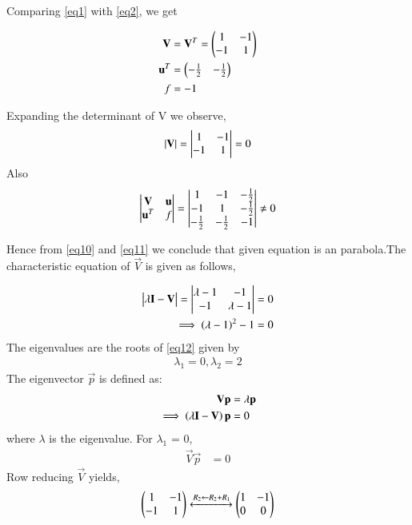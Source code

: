 \documentclass[journal,12pt,twocolumn]{IEEEtran}
\begin{document}
Comparing \eqref{eq1} with \eqref{eq2}, we get

\begin{align}
\mathbf{V} &= \mathbf{V}^T = \begin{pmatrix} 1 &  -1 \\ -1 & 1 \end{pmatrix}
\\
\mathbf{u}^T &= \begin{pmatrix}-\frac{1}{2} & - \frac{1}{2}\end{pmatrix}
\\
f &= -1
\end{align}


Expanding the determinant of V we observe,
\begin{align}
\left\vert\mathbf{V}\right\vert = \begin{vmatrix}1 & -1 \\ -1 & 1\end{vmatrix} = 0 \label{eq10}
\end{align}
Also
\begin{align}
\begin{vmatrix}\mathbf{V} & \mathbf{u} \\ \mathbf{u}^T & f\end{vmatrix} = 
\begin{vmatrix}
1 & -1 & -\frac{1}{2} \\ 
-1 & 1 & -\frac{1}{2} \\ 	
-\frac{1}{2} & -\frac{1}{2} & -1\end{vmatrix}
\neq 0
\label{eq11}
\end{align}

Hence from \eqref{eq10} and \eqref{eq11} we conclude
that given equation is an parabola.The characteristic equation of $\vec{V}$ is given as
follows,


\begin{align}
\begin{vmatrix}\lambda \mathbf{I}-\mathbf{V}\end{vmatrix} = \begin{vmatrix}\lambda -1 & -1 \\ -1 & \lambda - 1\end{vmatrix} &= 0
\\
\implies \left(\lambda - 1 \right)^2 -1 &= 0
\label{eq12}
\end{align}
The eigenvalues are the roots of \eqref{eq12} given by
\begin{align}
\lambda_1 = 0, \lambda_2 = 2
\label{eq13}
\end{align}
The eigenvector $\vec{p}$ is defined as:
\begin{align}
\mathbf{V} \mathbf{p}&= \lambda \mathbf{p}
\\
\implies \left(\lambda\mathbf{I}-\mathbf{V}\right)\mathbf{p} &=0
\end{align}
where $\lambda$ is the eigenvalue.  For $\lambda_1$ = 0,
\begin{align}
\vec{V} \vec{p}&=0
\end{align}
Row reducing $\vec{V}$ yields,
\begin{align}
 \begin{pmatrix} 1 & -1 \\ -1 & 1\end{pmatrix} 
\xleftrightarrow{R_2\leftarrow R_2+R_1} 
\begin{pmatrix}
	1 &  -1 \\ 0 & 0 
\end{pmatrix} 
\label{eq18}
\end{align}
\end{document}
